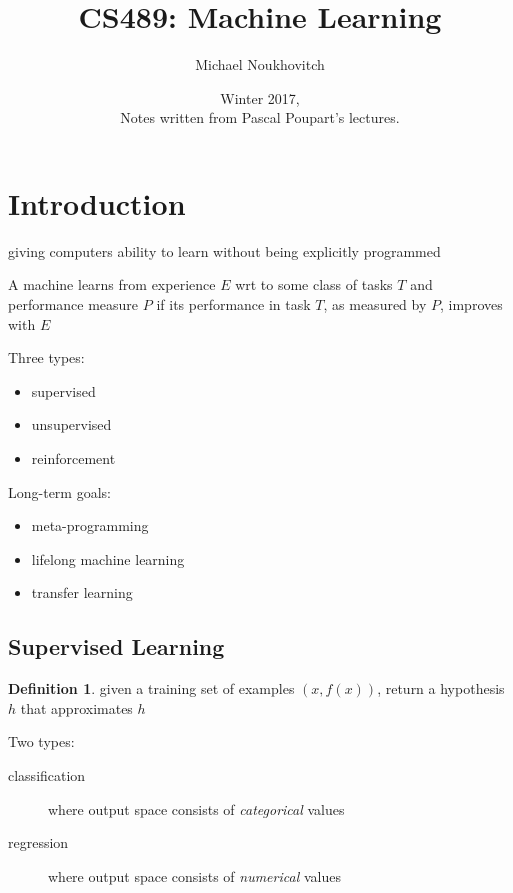 \documentclass[]{article}
\theoremstyle{definition}
\newtheorem*{defn}{Definition}
\begin{document}
	\let\ref\Cref

	\title{\bf{CS489: Machine Learning}}
	\date{Winter 2017, \\ \center Notes written from Pascal Poupart's lectures.}
	\author{Michael Noukhovitch}

	\maketitle
	\newpage
	\tableofcontents
	\newpage

	\section{Introduction}
	\begin{description} 
		\item[machine learning] giving computers ability to learn without being explicitly programmed
		\item A machine learns from experience $E$ wrt to some class of tasks $T$ and performance measure $P$ if its performance in task $T$, as measured by $P$, improves with $E$
	\end{description}

    Three types:
    \begin{itemize}
        \item supervised
        \item unsupervised
        \item reinforcement
    \end{itemize}

    Long-term goals:
    \begin{itemize}
        \item meta-programming
        \item lifelong machine learning
        \item transfer learning
    \end{itemize}

	\subsection{Supervised Learning}
	\begin{defn}
		given a training set of examples $(x,f(x))$, return a hypothesis $h$ that approximates $h$
	\end{defn}
	Two types:
	\begin{description}
		\item[classification] where output space consists of \textit{categorical} values
		\item[regression] where output space consists of \textit{numerical} values
	\end{description}
\end{document}
